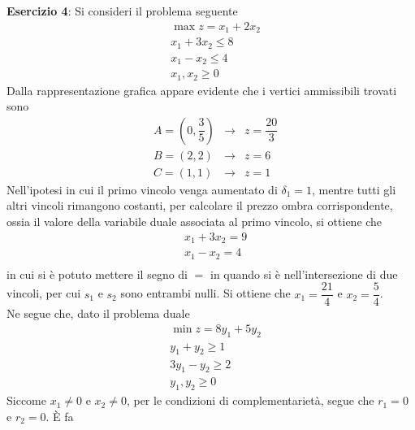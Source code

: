 \documentclass[a4paper]{extarticle}
\begin{document}
\vspace{1em}
\noindent
\textbf{Esercizio 4}: Si consideri il problema seguente
\begin{align*}
    &\max z = x_1 + 2x_2\\
    &x_1 + 3x_2 \leq 8\\
    &x_1 - x_2 \leq 4\\
    &x_1,x_2 \geq 0
\end{align*}
Dalla rappresentazione grafica appare evidente che i vertici ammissibili trovati sono
\begin{align*}
    &A = \left(0,\dfrac{3}{5}\right) & \rightarrow & z=\dfrac{20}{3}\\
    &B=(2,2) & \rightarrow & z=6\\
    &C=(1,1) & \rightarrow & z=1
\end{align*}
Nell'ipotesi in cui il primo vincolo venga aumentato di $\delta_1=1$, mentre tutti gli altri vincoli rimangono costanti, per calcolare il prezzo ombra corrispondente, ossia il valore della variabile duale associata al primo vincolo, si ottiene che
\begin{align*}
    &x_1 + 3x_2 = 9\\
    &x_1 - x_2 = 4\\
\end{align*}
in cui si è potuto mettere il segno di $=$ in quando si è nell'intersezione di due vincoli, per cui $s_1$ e $s_2$ sono entrambi nulli. Si ottiene che $x_1=\dfrac{21}{4}$ e $x_2=\dfrac{5}{4}$.\\
Ne segue che, dato il problema duale
\begin{align*}
    &\min z = 8y_1 + 5y_2\\
    &y_1 + y_2 \geq 1\\
    &3y_1 - y_2 \geq 2\\
    &y_1,y_2 \geq 0
\end{align*}
Siccome $x_1 \neq 0$ e $x_2 \neq 0$, per le condizioni di complementarietà, segue che $r_1=0$ e $r_2=0$. È fa
\end{document}
